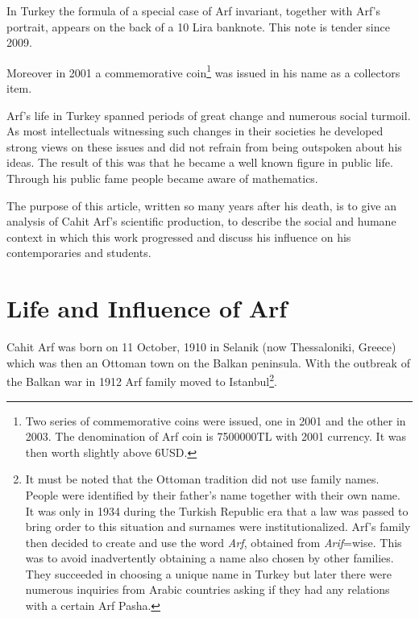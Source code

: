 \documentclass[12pt]{amsart}
\begin{document}
In Turkey the formula of a special case of Arf invariant, together with Arf's portrait, appears on the back of a 10 Lira banknote. This note is tender since 2009.
\begin{center}
\end{center}
Moreover in 2001 a commemorative coin\footnote{Two series of commemorative coins were issued, one in 2001 and the other in 2003. The denomination of Arf coin is 7500000TL with 2001 currency. It was then worth slightly above 6USD.} was issued in his name as a collectors item.
\begin{center}
\end{center}

Arf's life in Turkey spanned periods of great change and numerous social turmoil. As most intellectuals witnessing such changes in their societies he developed strong views on these issues and did not refrain from being outspoken about his ideas. The result of this was that he became a well known figure in public life.  Through his public fame people became aware of mathematics.

The purpose of this article, written so many years after his death, is to give an analysis of Cahit
Arf's scientific production, to describe the social
and humane context in which this work progressed and discuss his influence on his contemporaries and students.

\section{Life and Influence of Arf}
Cahit Arf was born on 11 October, 1910 in Selanik (now Thessaloniki, Greece) which was then an Ottoman town on the Balkan peninsula. With the outbreak of the Balkan war in 1912 Arf family moved to Istanbul\footnote{It must be noted that the Ottoman tradition did not use family names. People were identified by their father's name together with their own name.  It was only in 1934 during the Turkish Republic era that a law was passed to bring order to this situation and surnames were institutionalized. Arf's family then decided to create and use the word \emph{Arf}, obtained  from \emph{Arif}=wise. This was to avoid inadvertently obtaining a name also chosen by other families. They succeeded in choosing a unique name in Turkey but later there were numerous inquiries from Arabic countries asking if they had any relations with a certain Arf Pasha.}.
\end{document}
